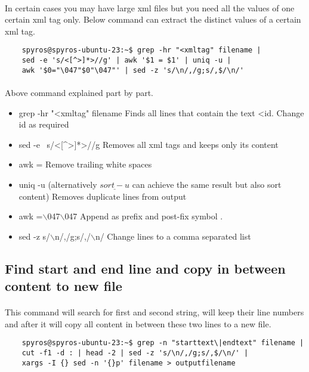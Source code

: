 \documentclass{article}
\begin{document}
\paragraph{} In certain cases you may have large xml files but you need all the values of one certain xml tag only. Below command can extract the distinct values of a certain xml tag.
\begin{lstlisting}
	spyros@spyros-ubuntu-23:~$ grep -hr "<xmltag" filename |
	sed -e 's/<[^>]*>//g' | awk '$1 = $1' | uniq -u |
	awk '$0="\047"$0"\047"' | sed -z 's/\n/,/g;s/,$/\n/'
\end{lstlisting}

\paragraph{} Above command explained part by part.
\begin{itemize}
	\item grep -hr "<xmltag" filename
		\subitem Finds all lines that contain the text <id. Change id as required
	\item sed -e \ \textquotesingle{}s/<[\^{}>]*>//g\textquotesingle
		\subitem Removes all xml tags and keeps only its content
	\item awk \textquotesingle {} = \textquotesingle
		\subitem Remove trailing white spaces
	\item uniq -u (alternatively $\underline{sort -u}$ can achieve the same result but also sort content)
		\subitem Removes duplicate lines from output
	\item awk \textquotesingle{}=\textquotedbl$\backslash$047\textquotedbl{}\textquotedbl$\backslash$047\textquotedbl\textquotesingle
		\subitem Append as prefix and post-fix symbol \textquotesingle.
	\item sed -z \textquotesingle s/$\backslash$n/,/g;s/,\textdollar/$\backslash$n/\textquotesingle
		\subitem Change lines to a comma separated list
\end{itemize}

\subsection{Find start and end line and copy in between content to new file}
\paragraph{} This command will search for first and second string, will keep their line numbers and after it will copy all content in between these two lines to a new file.
\begin{lstlisting}
	spyros@spyros-ubuntu-23:~$ grep -n "starttext\|endtext" filename |
	cut -f1 -d : | head -2 | sed -z 's/\n/,/g;s/,$/\n/' |
	xargs -I {} sed -n '{}p' filename > outputfilename

\end{lstlisting}
\end{document}

